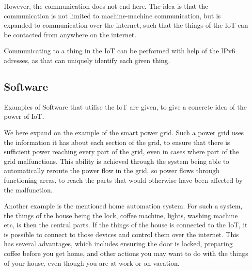 However, the communication does not end here.
The idea is that the communication is not limited to machine-machine communication, but is expanded to communication over the internet, such that the things of the IoT can be contacted from anywhere on the internet.

Communicating to a thing in the IoT can be performed with help of the IPv6 adresses, as that can uniquely identify each given thing.

\subsection{Software}
Examples of Software that utilise the IoT are given, to give a concrete idea of the power of IoT.

We here expand on the example of the smart power grid.
Such a power grid uses the information it has about each section of the grid, to ensure that there is sufficient power reaching every part of the grid, even in cases where part of the grid malfunctions.
This ability is achieved through the system being able to automatically reroute the power flow in the grid, so power flows through functioning areas, to reach the parts that would otherwise have been affected by the malfunction.

Another example is the mentioned home automation system.
For such a system, the things of the house being the lock, coffee machine, lights, washing machine etc, is then the central parts.
If the things of the house is connected to the IoT, it is possible to connect to those devices and control them over the internet.
This has several advantages, which includes ensuring the door is locked, preparing coffee before you get home, and other actions you may want to do with the things of your house, even though you are at work or on vacation.